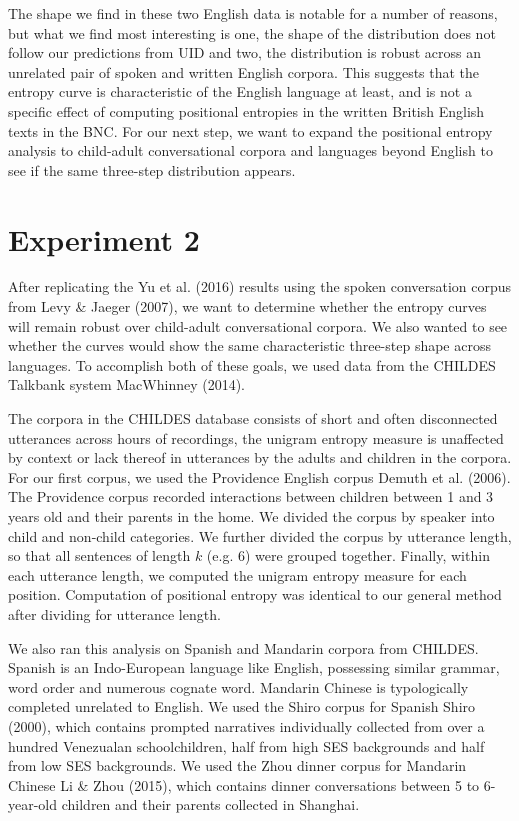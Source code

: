\documentclass[10pt, letterpaper]{article}
\begin{document}
The shape we find in these two English data is notable for a number of
reasons, but what we find most interesting is one, the shape of the
distribution does not follow our predictions from UID and two, the
distribution is robust across an unrelated pair of spoken and written
English corpora. This suggests that the entropy curve is characteristic
of the English language at least, and is not a specific effect of
computing positional entropies in the written British English texts in
the BNC. For our next step, we want to expand the positional entropy
analysis to child-adult conversational corpora and languages beyond
English to see if the same three-step distribution appears.

\hypertarget{experiment-2}{%
\section{Experiment 2}\label{experiment-2}}

After replicating the Yu et al. (2016) results using the spoken
conversation corpus from Levy \& Jaeger (2007), we want to determine
whether the entropy curves will remain robust over child-adult
conversational corpora. We also wanted to see whether the curves would
show the same characteristic three-step shape across languages. To
accomplish both of these goals, we used data from the CHILDES Talkbank
system MacWhinney (2014).

The corpora in the CHILDES database consists of short and often
disconnected utterances across hours of recordings, the unigram entropy
measure is unaffected by context or lack thereof in utterances by the
adults and children in the corpora. For our first corpus, we used the
Providence English corpus Demuth et al. (2006). The Providence corpus
recorded interactions between children between 1 and 3 years old and
their parents in the home. We divided the corpus by speaker into child
and non-child categories. We further divided the corpus by utterance
length, so that all sentences of length \(k\) (e.g. \(6\)) were grouped
together. Finally, within each utterance length, we computed the unigram
entropy measure for each position. Computation of positional entropy was
identical to our general method after dividing for utterance length.

We also ran this analysis on Spanish and Mandarin corpora from CHILDES.
Spanish is an Indo-European language like English, possessing similar
grammar, word order and numerous cognate word. Mandarin Chinese is
typologically completed unrelated to English. We used the Shiro corpus
for Spanish Shiro (2000), which contains prompted narratives
individually collected from over a hundred Venezualan schoolchildren,
half from high SES backgrounds and half from low SES backgrounds. We
used the Zhou dinner corpus for Mandarin Chinese Li \& Zhou (2015),
which contains dinner conversations between 5 to 6-year-old children and
their parents collected in Shanghai.
\end{document}
